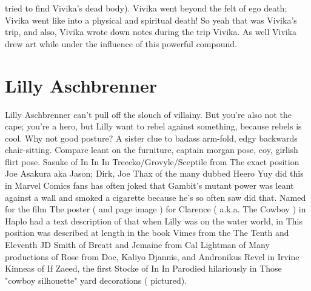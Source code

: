 \documentclass[12pt]{book}
\begin{document}
tried to find Vivika's dead body). Vivika went beyond the felt of ego death; Vivika went like into a physical and spiritual death! So yeah that was Vivika's trip, and also, Vivika wrote down notes during the trip Vivika. As well Vivika drew art while under the influence of this powerful compound.



\chapter{Lilly Aschbrenner}

Lilly Aschbrenner can't pull off the slouch of villainy. But you're also not the cape; you're a hero, but Lilly want to rebel against something, because rebels is cool. Why not good posture? A sister clue to badass arm-fold, edgy backwards chair-sitting. Compare leant on the furniture, captain morgan pose, coy, girlish flirt pose. Sasuke of In In In Treecko/Grovyle/Sceptile from The exact position Joe Asakura aka Jason; Dirk, Joe Thax of the many dubbed Heero Yuy did this in Marvel Comics fans has often joked that Gambit's mutant power was leant against a wall and smoked a cigarette because he's so often saw did that. Named for the film The poster ( and page image ) for Clarence ( a.k.a. The Cowboy ) in Haplo had a text description of that when Lilly was on the water world, in This position was described at length in the book Vimes from the The Tenth and Eleventh JD Smith of Breatt and Jemaine from Cal Lightman of Many productions of Rose from Doc, Kaliyo Djannis, and Andronikus Revel in Irvine Kinneas of If Zaeed, the first Stocke of In In Parodied hilariously in Those "cowboy silhouette" yard decorations ( pictured).
\end{document}
